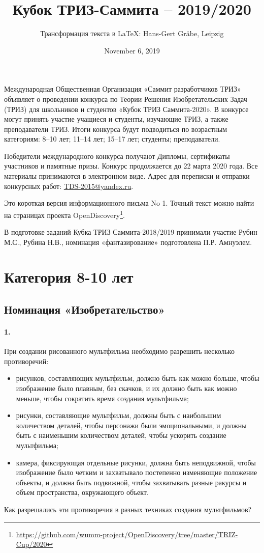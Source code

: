\documentclass[11pt,a4paper]{article}
\title{Кубок ТРИЗ-Саммита – 2019/2020}
\author{Трансформация текста в \LaTeX: Hans-Gert Gr\"abe, Leipzig}
\date{November 6, 2019}
\newcommand{\credentials}{В подготовке заданий Кубка ТРИЗ Саммита-2018/2019
  принимали участие Рубин М.С., Рубина Н.В., номинация «фантазирование»
  подготовлена П.Р. Амнуэлем.}
\begin{document}
\maketitle

Международная Общественная Организация «Саммит разработчиков ТРИЗ» объявляет о
проведении конкурса по Теории Решения Изобретательских Задач (ТРИЗ) для
школьников и студентов «Кубок ТРИЗ Саммита-2020». В конкурсе могут принять
участие учащиеся и студенты, изучающие ТРИЗ, а также преподаватели ТРИЗ.
Итоги конкурса будут подводиться по возрастным категориям: 8--10 лет; 11--14
лет; 15--17 лет; студенты; преподаватели.

Победители международного конкурса получают Дипломы, сертификаты участников и
памятные призы.  Конкурс продолжается до 22 марта 2020 года. Все материалы
принимаются в электронном виде. Адрес для переписки и отправки конкурсных
работ: \url{TDS-2015@yandex.ru}.

Это короткая версия информационного письма No 1. Точный текст можно найти на
страницах проекта
OpenDiscovery\footnote{\url{https://github.com/wumm-project/OpenDiscovery/tree/master/TRIZ-Cup/2020}}. 

\credentials
\vfill
\tableofcontents
\vfill
\clearpage
\section{Категория 8-10 лет}

\subsection*{Номинация «Изобретательство»}

\paragraph{1.}
При создании рисованного мультфильма необходимо разрешить несколько
противоречий:
\begin{itemize}
\item рисунков, составляющих мультфильм, должно быть как можно больше, чтобы
  изображение было плавным, без скачков, и их должно быть как можно меньше,
  чтобы сократить время создания мультфильма;
\item рисунки, составляющие мультфильм, должны быть с наибольшим количеством
  деталей, чтобы персонажи были эмоциональными, и должны быть с наименьшим
  количеством деталей, чтобы ускорить создание мультфильма;
\item камера, фиксирующая отдельные рисунки, должна быть неподвижной, чтобы
  изображение было четким и захватывало постепенно изменяющие положение
  объекты, и должна быть подвижной, чтобы захватывать разные ракурсы и объем
  пространства, окружающего объект.
\end{itemize}
Как разрешались эти противоречия в разных техниках создания мультфильмов?
\end{document}
